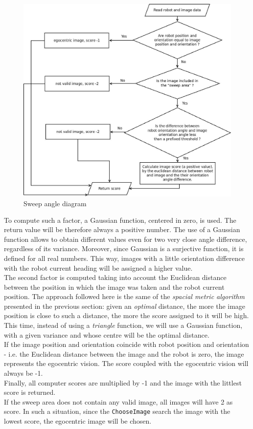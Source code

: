 \begin{figure}[!h]
  \begin{center}
    \includegraphics[width=\textwidth]{img/sweep_angle_diagram.png} 
    \caption{Sweep angle diagram}
    \label{fig:sweep_angle_diagram}
  \end{center}
\end{figure}
To compute such a factor, a Gaussian function, centered
in zero, is used. The return value will be therefore 
always a positive number.
The use of a Gaussian function allows to obtain different 
values even for two very close angle difference, 
regardless of its variance. 
Moreover, since Gaussian is a surjective function, 
it is defined for all real numbers.
This way, images with a little orientation difference with 
the robot current heading will be assigned a higher value.
\\
The second factor is computed taking into account the Euclidean 
distance between the position in which the image was taken 
and the robot current position. 
The approach followed here is the same of the \textit{spacial 
metric algorithm} presented in the previous section: 
given an \textit{optimal} distance, the more the image position 
is close to such a distance, the more the score assigned 
to it will be high.
This time, instead of using a \textit{triangle} function, 
we will use a Gaussian function, with a given variance and 
whose centre will be the optimal distance.
\\
If the image position and orientation coincide with robot position 
and orientation - i.e. the Euclidean distance between the image and 
the robot is zero, the image represents the egocentric vision. 
The score coupled with the egocentric vision will 
always be -1.
\\
Finally, all computer scores are multiplied by -1 and 
the image with the littlest score is returned.
\\
If the sweep area does not contain any valid image, all images will
have 2 as score. In such a situation, since the \texttt{ChooseImage} 
search the image with the lowest score, the egocentric image 
will be chosen.

